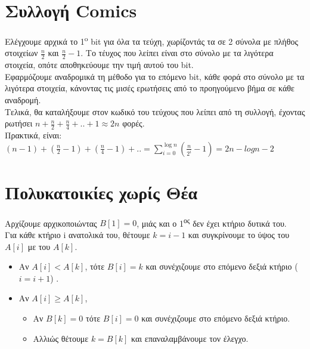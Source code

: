 \documentclass[a4paper,10pt]{article} \usepackage{anysize}
\begin{document}
\section{Συλλογή Comics}
Ελέγχουμε αρχικά το 1\textsuperscript{o} bit για όλα τα τεύχη, χωρίζοντάς τα
σε 2 σύνολα με πλήθος στοιχείων $\frac{n}{2}$ και $\frac{n}{2}-1$. Το τέυχος
που λείπει είναι στο σύνολο με τα λιγότερα στοιχεία, οπότε αποθηκεύουμε την
τιμή αυτού του bit. \\
Εφαρμόζουμε αναδρομικά τη μέθοδο για το επόμενο bit, κάθε φορά στο σύνολο με τα λιγότερα στοιχεία,
κάνοντας τις μισές ερωτήσεις από το προηγούμενο βήμα σε κάθε αναδρομή. \\
Τελικά, θα καταλήξουμε στον κωδικό του τεύχους που λείπει από τη συλλογή, έχοντας
ρωτήσει $n+\frac{n}{2}+\frac{n}{4}+..+1 \approx 2n$ φορές.\\
Πρακτικά, είναι: $(n-1)+(\frac{n}{2}-1)+(\frac{n}{4} -1)+..=
\displaystyle\sum\limits_{i=0}^{\log{n}} (\frac{n}{2^i} -1) = 2n - log{n} -2$


\pagebreak

\section{Πολυκατοικίες χωρίς Θέα}
Αρχίζουμε αρχικοποιώντας $B[1] = 0$, μιάς και ο 1\textsuperscript{ος} δεν έχει
κτήριο δυτικά του.\\
Για κάθε κτήριο i ανατολικά του, θέτουμε $k= i-1$ και συγκρίνουμε το ύψος του $A[i]$ με του
$A[k]$.
\begin{itemize}
\item Αν $A[i]<A[k]$, τότε $B[i] = k$ και συνέχιζουμε στο επόμενο δεξιά
κτήριο ($i= i+1$) .
\item Αν $A[i] \ge A[k]$,
\begin{itemize}
\item Αν $B[k] = 0$ τότε $B[i] = 0$ και συνέχιζουμε στο επόμενο δεξιά
κτήριο.
\item Αλλιώς θέτουμε $k = B[k]$ και επαναλαμβάνουμε τον έλεγχο.
\end{itemize}
\end{itemize}

\end{document}
